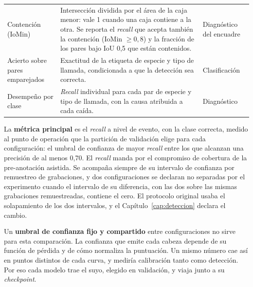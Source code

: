 \begin{table}[htbp]
\begin{tabular}{@{}L{3.6cm}L{7.3cm}L{2.8cm}@{}}
        \addlinespace
        Contención (IoMin)                                               &
        Intersección dividida por el área de la caja menor: vale 1 cuando una
        caja contiene a la otra. Se reporta el \textit{recall} que acepta
        también la contención (IoMin $\geq 0{,}8$) y la fracción de los pares
        bajo IoU 0,5 que están contenidos.                               &
        Diagnóstico del encuadre                                                                              \\
        \addlinespace
        Acierto sobre pares emparejados                                  &
        Exactitud de la etiqueta de especie y tipo de llamada, condicionada a
        que la detección sea correcta.                                   &
        Clasificación                                                                                         \\
        \addlinespace
        Desempeño por clase                                              &
        \textit{Recall} individual para cada par de especie y tipo de llamada,
        con la causa atribuida a cada caída.                             &
        Diagnóstico                                                                                           \\
        \bottomrule
    \end{tabular}
\end{table}

La \textbf{métrica principal} es el \textit{recall} a nivel de evento, con la
clase correcta, medido
al punto de operación que la partición de validación elige para cada
configuración: el umbral de confianza de mayor \textit{recall} entre los que
alcanzan una precisión de al menos 0,70. El \textit{recall} manda por el
compromiso de cobertura de la pre-anotación asistida. Se acompaña siempre de su intervalo
de confianza por remuestreo de grabaciones, y dos configuraciones se declaran no
separadas por el experimento cuando el intervalo de su diferencia, con las dos
sobre las mismas grabaciones remuestreadas, contiene el cero. El protocolo
original usaba el solapamiento de los dos intervalos, y el
Capítulo~\ref{cap:deteccion} declara el cambio.

Un \textbf{umbral de confianza fijo y compartido} entre configuraciones no sirve
para esta comparación. La confianza que emite cada cabeza depende de su función de
pérdida y de cómo normaliza la puntuación. Un mismo número cae así en puntos
distintos de cada curva, y mediría calibración tanto como detección. Por eso cada
modelo trae el suyo, elegido en validación, y viaja junto a su
\textit{checkpoint}.

